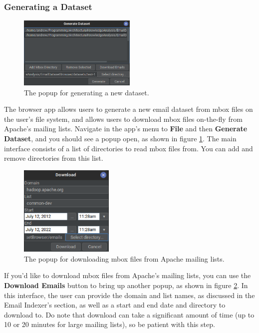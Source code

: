 \documentclass[a4paper, 12pt]{article}
\begin{document}
		\subsubsection{Generating a Dataset}
			\begin{figure}
				\includegraphics[width=0.5\textwidth]{img/edb-app_generate-dataset-popup.png}
				\caption{The popup for generating a new dataset.}
				\label{fig:edb-app-generate-dataset}
			\end{figure}
			The browser app allows users to generate a new email dataset from mbox files on the user's file system, and allows users to download mbox files on-the-fly from Apache's mailing lists. Navigate in the app's menu to \textbf{File} and then \textbf{Generate Dataset}, and you should see a popup open, as shown in figure \ref{fig:edb-app-generate-dataset}. The main interface consists of a list of directories to read mbox files from. You can add and remove directories from this list.
			
			\begin{figure}
				\includegraphics[width=0.4\textwidth]{img/edb-app_download-popup.png}
				\caption{The popup for downloading mbox files from Apache mailing lists.}
				\label{fig:edb-app-download-emails}
			\end{figure}
		
			If you'd like to download mbox files from Apache's mailing lists, you can use the \textbf{Download Emails} button to bring up another popup, as shown in figure \ref{fig:edb-app-download-emails}. In this interface, the user can provide the domain and list names, as discussed in the Email Indexer's section, as well as a start and end date and directory to download to. Do note that download can take a significant amount of time (up to 10 or 20 minutes for large mailing lists), so be patient with this step.
			
\end{document}
